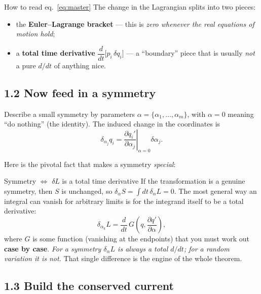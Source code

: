 \documentclass[11pt]{article}
\newcommand{\dd}[2]{\frac{\partial #1}{\partial #2}}
\newcommand{\ddt}[1]{\frac{d#1}{dt}}
\begin{document}
\begin{keybox}{How to read eq.~\eqref{eq:master}}
The change in the Lagrangian splits into two pieces:
\begin{itemize}[nosep]
  \item the \textbf{Euler--Lagrange bracket} --- this is \emph{zero whenever the
  real equations of motion hold};
  \item a \textbf{total time derivative} $\dfrac{d}{dt}\big[p_i\,\delta q_i\big]$
  --- a ``boundary'' piece that is usually \emph{not} a pure $d/dt$ of anything
  nice.
\end{itemize}
\end{keybox}

\subsection*{1.2 Now feed in a symmetry}

Describe a small symmetry by parameters $\alpha=\{\alpha_1,\dots,\alpha_m\}$,
with $\alpha=0$ meaning ``do nothing'' (the identity). The induced change in the
coordinates is
\begin{equation}
\delta_{\alpha_j} q_i = \left.\dd{q_i'}{\alpha_j}\right|_{\alpha=0}\delta\alpha_j .
\end{equation}

Here is the pivotal fact that makes a symmetry \emph{special}:

\begin{keybox}{Symmetry $\Leftrightarrow$ $\delta L$ is a total time derivative}
If the transformation is a genuine symmetry, then $S$ is unchanged, so
$\delta_\alpha S=\int dt\,\delta_\alpha L=0$. The most general way an integral can
vanish for arbitrary limits is for the integrand itself to be a total
derivative:
\begin{equation}
\delta_{\alpha_k} L = \ddt{}\,G\!\left(q,\dd{q'}{\alpha}\right),
\end{equation}
where $G$ is some function (vanishing at the endpoints) that you must work out
\textbf{case by case}. \emph{For a symmetry $\delta_\alpha L$ is always a total
$d/dt$; for a random variation it is not.} That single difference is the engine
of the whole theorem.
\end{keybox}

\subsection*{1.3 Build the conserved current}
\end{document}
